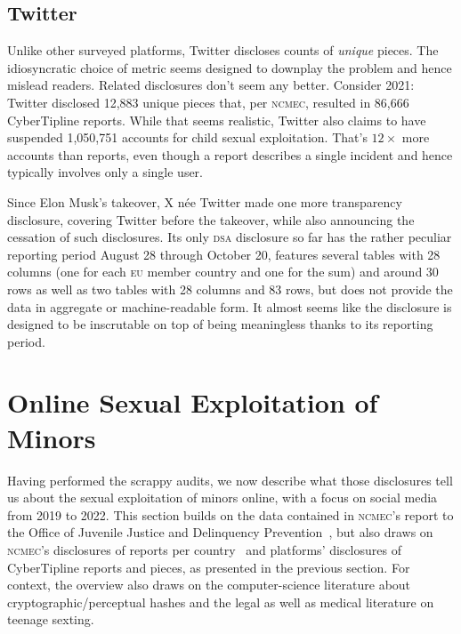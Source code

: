 \documentclass[nonacm,screen]{acmart}
\newcommand\V[1]{\textsc{\MakeLowercase{#1}}}
\begin{document}
\begin{itemize}
{\subsection{Twitter}

Unlike other surveyed platforms, Twitter discloses counts of \emph{unique}
pieces. The idiosyncratic choice of metric seems designed to downplay the
problem and hence mislead readers. Related disclosures don't seem any better.
Consider 2021: Twitter disclosed 12,883 unique pieces that, per \V{NCMEC},
resulted in 86,666 CyberTipline reports. While that seems realistic, Twitter
also claims to have suspended 1,050,751 accounts for child sexual exploitation.
That's $12\times$ more accounts than reports, even though a report describes a
single incident and hence typically involves only a single user.

Since Elon Musk's takeover, X née Twitter made one more transparency disclosure,
covering Twitter before the takeover, while also announcing the cessation of
such disclosures. Its only \V{DSA} disclosure so far has the rather peculiar
reporting period August 28 through October 20, features several tables with 28
columns (one for each \V{EU} member country and one for the sum) and around 30
rows as well as two tables with 28 columns and 83 rows, but does not provide the
data in aggregate or machine-readable form. It almost seems like the disclosure
is designed to be inscrutable on top of being meaningless thanks to its
reporting period.



\section{Online Sexual Exploitation of Minors}
\label{sec:global-spread}

Having performed the scrappy audits, we now describe what those disclosures tell
us about the sexual exploitation of minors online, with a focus on social media
from 2019 to 2022. This section builds on the data contained in \V{NCMEC}'s
report to the Office of Juvenile Justice and Delinquency
Prevention~\cite{NCMEC2023}, but also draws on \V{NCMEC}'s disclosures of
reports per country~\cite{NcmecByCountry2019,NcmecByCountry2020,
NcmecByCountry2021,NcmecByCountry2022} and platforms' disclosures of
CyberTipline reports and pieces, as presented in the previous section. For
context, the overview also draws on the computer-science literature about
cryptographic/perceptual hashes and the legal as well as medical literature on
teenage sexting.

}
\end{itemize}
\end{document}
